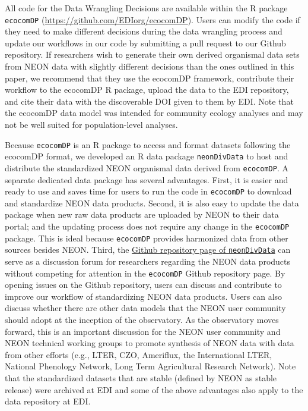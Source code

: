 \documentclass[
  12pt,
]{article}
\begin{document}
All code for the Data Wrangling Decisions are available within the R package \texttt{ecocomDP} (\url{https://github.com/EDIorg/ecocomDP}). Users can modify the code if they need to make different decisions during the data wrangling process and update our workflows in our code by submitting a pull request to our Github repository. If researchers wish to generate their own derived organismal data sets from NEON data with slightly different decisions than the ones outlined in this paper, we recommend that they use the ecocomDP framework, contribute their workflow to the ecocomDP R package, upload the data to the EDI repository, and cite their data with the discoverable DOI given to them by EDI. Note that the ecocomDP data model was intended for community ecology analyses and may not be well suited for population-level analyses.

Because \texttt{ecocomDP} is an R package to access and format datasets following the ecocomDP format, we developed an R data package \texttt{neonDivData} to host and distribute the standardized NEON organismal data derived from \texttt{ecocomDP}. A separate dedicated data package has several advantages. First, it is easier and ready to use and saves time for users to run the code in \texttt{ecocomDP} to download and standardize NEON data products. Second, it is also easy to update the data package when new raw data products are uploaded by NEON to their data portal; and the updating process does not require any change in the \texttt{ecocomDP} package. This is ideal because \texttt{ecocomDP} provides harmonized data from other sources besides NEON. Third, the \href{(https://github.com/daijiang/neonDivData)}{Github repository page of \texttt{neonDivData}} can serve as a discussion forum for researchers regarding the NEON data products without competing for attention in the \texttt{ecocomDP} Github repository page. By opening issues on the Github repository, users can discuss and contribute to improve our workflow of standardizing NEON data products. Users can also discuss whether there are other data models that the NEON user community should adopt at the inception of the observatory. As the observatory moves forward, this is an important discussion for the NEON user community and NEON technical working groups to promote synthesis of NEON data with data from other efforts (e.g., LTER, CZO, Ameriflux, the International LTER, National Phenology Network, Long Term Agricultural Research Network). Note that the standardized datasets that are stable (defined by NEON as stable release) were archived at EDI and some of the above advantages also apply to the data repository at EDI.
\end{document}
